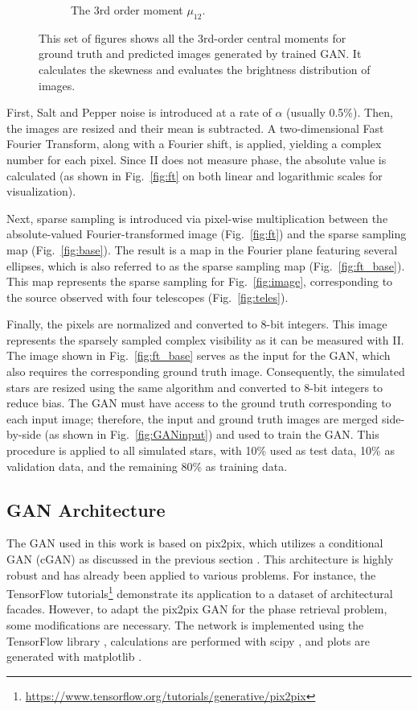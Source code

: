 \begin{figure}
\begin{subfigure}{0.50\linewidth}
		\caption{The 3rd order moment $\mu_{12}$.}
		\label{fig:mom10}
	\end{subfigure}\hfill
	\caption{This set of figures shows all the 3rd-order central moments for ground truth and predicted images generated by trained GAN. It calculates the skewness and evaluates the brightness distribution of images.}
	\label{fig:moments}
\end{figure}



First, Salt and Pepper noise is introduced at a rate of \(\alpha\) (usually 0.5\%). Then, the images are resized and their mean is subtracted. A two-dimensional Fast Fourier Transform, along with a Fourier shift, is applied, yielding a complex number for each pixel. Since II does not measure phase, the absolute value is calculated (as shown in Fig.~\ref{fig:ft} on both linear and logarithmic scales for visualization). 

Next, sparse sampling is introduced via pixel-wise multiplication between the absolute-valued Fourier-transformed image (Fig.~\ref{fig:ft}) and the sparse sampling map (Fig.~\ref{fig:base}). The result is a map in the Fourier plane featuring several ellipses, which is also referred to as the sparse sampling map (Fig.~\ref{fig:ft_base}). This map represents the sparse sampling for Fig.~\ref{fig:image}, corresponding to the source observed with four telescopes (Fig.~\ref{fig:teles}). 

Finally, the pixels are normalized and converted to 8-bit integers. This image represents the sparsely sampled complex visibility as it can be measured with II. The image shown in Fig.~\ref{fig:ft_base} serves as the input for the GAN, which also requires the corresponding ground truth image. Consequently, the simulated stars are resized using the same algorithm and converted to 8-bit integers to reduce bias. The GAN must have access to the ground truth corresponding to each input image; therefore, the input and ground truth images are merged side-by-side (as shown in Fig.~\ref{fig:GANinput}) and used to train the GAN. This procedure is applied to all simulated stars, with 10\% used as test data, 10\% as validation data, and the remaining 80\% as training data.


\subsection{GAN Architecture}
The GAN used in this work is based on pix2pix, which utilizes a conditional GAN (cGAN) as discussed in the previous section \cite{isola2017image}. This architecture is highly robust and has already been applied to various problems. For instance, the TensorFlow tutorials\footnote{\url{https://www.tensorflow.org/tutorials/generative/pix2pix}} demonstrate its application to a dataset of architectural facades. However, to adapt the pix2pix GAN for the phase retrieval problem, some modifications are necessary. The network is implemented using the TensorFlow library \cite{abadi2016tensorflow}, calculations are performed with scipy \cite{virtanen2020scipy}, and plots are generated with matplotlib \cite{4160265}.

